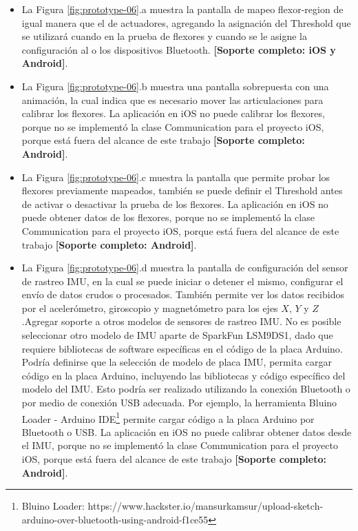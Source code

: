 \begin{itemize}

\item La Figura \ref{fig:prototype-06}.a muestra la pantalla de mapeo flexor-region de igual manera que el de actuadores, agregando la asignación del Threshold que se utilizará cuando en la prueba de flexores y cuando se le asigne la configuración al o los dispositivos Bluetooth. \textbf{[Soporte completo: iOS y Android]}.

\item La Figura \ref{fig:prototype-06}.b muestra una pantalla sobrepuesta con una animación, la cual indica que es necesario mover las articulaciones para calibrar los flexores. La aplicación en iOS no puede calibrar los flexores, porque no se implementó la clase Communication para el proyecto iOS, porque está fuera del alcance de este trabajo \textbf{[Soporte completo: Android]}.

\item La Figura \ref{fig:prototype-06}.c muestra la pantalla que permite probar los flexores previamente mapeados, también se puede definir el Threshold antes de activar o desactivar la prueba de los flexores. La aplicación en iOS no puede obtener datos de los flexores, porque no se implementó la clase Communication para el proyecto iOS, porque está fuera del alcance de este trabajo \textbf{[Soporte completo: Android]}.

\item La Figura \ref{fig:prototype-06}.d muestra la pantalla de configuración del sensor de rastreo IMU, en la cual se puede iniciar o detener el mismo, configurar el envío de datos crudos o procesados. También permite ver los datos recibidos por el acelerómetro, giroscopio y magnetómetro para los ejes $X$, $Y$ y $Z$.Agregar soporte a otros modelos de sensores de rastreo IMU. No es posible seleccionar otro modelo de IMU aparte de SparkFun LSM9DS1, dado que requiere bibliotecas de software específicas en el código de la placa Arduino. Podría definirse que la selección de modelo de placa IMU, permita cargar código en la placa Arduino, incluyendo las bibliotecas y código específico del modelo del IMU. Esto podría ser realizado utilizando la conexión Bluetooth o por medio de conexión USB adecuada. Por ejemplo, la herramienta Bluino Loader - Arduino IDE\footnote{Bluino Loader: https://www.hackster.io/mansurkamsur/upload-sketch-arduino-over-bluetooth-using-android-f1ce55} permite cargar código a la placa Arduino por Bluetooth o USB. La aplicación en iOS no puede calibrar obtener datos desde el IMU, porque no se implementó la clase Communication para el proyecto iOS, porque está fuera del alcance de este trabajo \textbf{[Soporte completo: Android]}.

\end{itemize}
